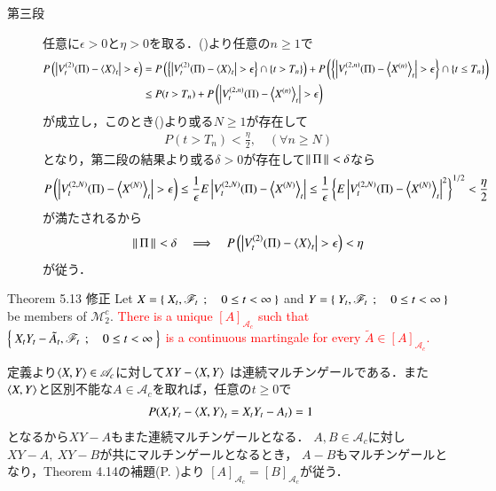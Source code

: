 \begin{prf}
\begin{description}
			\item[第三段]
				任意に$\epsilon > 0$と$\eta > 0$を取る．()より任意の$n \geq 1$で
				\begin{align}
					P\left(\left|V_t^{(2)}(\Pi) - \inprod<X>_t\right| > \epsilon\right)
					&= P\left(\left\{\left|V_t^{(2)}(\Pi) - \inprod<X>_t\right| > \epsilon\right\} \cap \{t > T_n\}\right)
						+ P\left(\left\{\left|V_t^{(2,n)}(\Pi) - \inprod<X^{(n)}>_t\right| > \epsilon\right\} \cap \{t \leq T_n\}\right) \\
					&\leq P(t > T_n) + P\left(\left|V_t^{(2,n)}(\Pi) - \inprod<X^{(n)}>_t\right| > \epsilon\right)
				\end{align}
				が成立し，このとき()より或る$N \geq 1$が存在して
				\begin{align}
					P(t > T_n) < \frac{\eta}{2},\quad (\forall n \geq N)
				\end{align}
				となり，第二段の結果より或る$\delta > 0$が存在して$\left\|\, \Pi\, \right\|_{} < \delta$なら
				\begin{align}
					P\left(\left|V_t^{(2,N)}(\Pi) - \inprod<X^{(N)}>_t\right| > \epsilon\right)
					\leq \frac{1}{\epsilon} E\left|V_t^{(2,N)}(\Pi) - \inprod<X^{(N)}>_t\right|
					\leq \frac{1}{\epsilon} \left\{E\left|V_t^{(2,N)}(\Pi) - \inprod<X^{(N)}>_t\right|^2 \right\}^{1/2}
					< \frac{\eta}{2}
				\end{align}
				が満たされるから
				\begin{align}
					\Norm{\Pi}{} < \delta
					\quad \Longrightarrow \quad 
					P\left(\left|V_t^{(2)}(\Pi) - \inprod<X>_t\right| > \epsilon\right) < \eta
				\end{align}
				が従う．
				\QED
		\end{description}
	\end{prf}
	
	\begin{itembox}[l]{Theorem 5.13 修正}
		Let $X = \left\{\ X_t,\mathscr{F}_t\ \, ; \quad 0 \leq t < \infty\ \right\}$ and $Y = \left\{\ Y_t,\mathscr{F}_t\ \, ; \quad 0 \leq t < \infty\ \right\}$
		be members of $\mathscr{M}_2^c$. \textcolor{red}{There is a unique $[A]_{\mathscr{A}_c}$ such that
		$\left\{\ X_t Y_t - \tilde{A}_t,\mathscr{F}_t\ \, ; \quad 0 \leq t < \infty\ \right\}$ is a continuous martingale
		for every $\tilde{A} \in [A]_{\mathscr{A}_c}$.}
	\end{itembox}
	
	\begin{prf}
		定義より$\inprod<X,Y> \in \mathscr{A}_c$に対して$XY - \inprod<X,Y>$
		は連続マルチンゲールである．また$\inprod<X,Y>$と区別不能な$A \in \mathscr{A}_c$を取れば，任意の$t \geq 0$で
		\begin{align}
			P(X_t Y_t - \inprod<X,Y>_t = X_t Y_t - A_t) = 1
		\end{align}
		となるから$XY-A$もまた連続マルチンゲールとなる．
		$A,B \in \mathscr{A}_c$に対し$XY - A,\ XY-B$が共にマルチンゲールとなるとき，
		$A - B$もマルチンゲールとなり，Theorem 4.14の補題(P. \pageref{lem:uniqueness_of_Doob_Meyer_decomposition})より
		$[A]_{\mathscr{A}_c} = [B]_{\mathscr{A}_c}$が従う．
		\QED
	\end{prf}